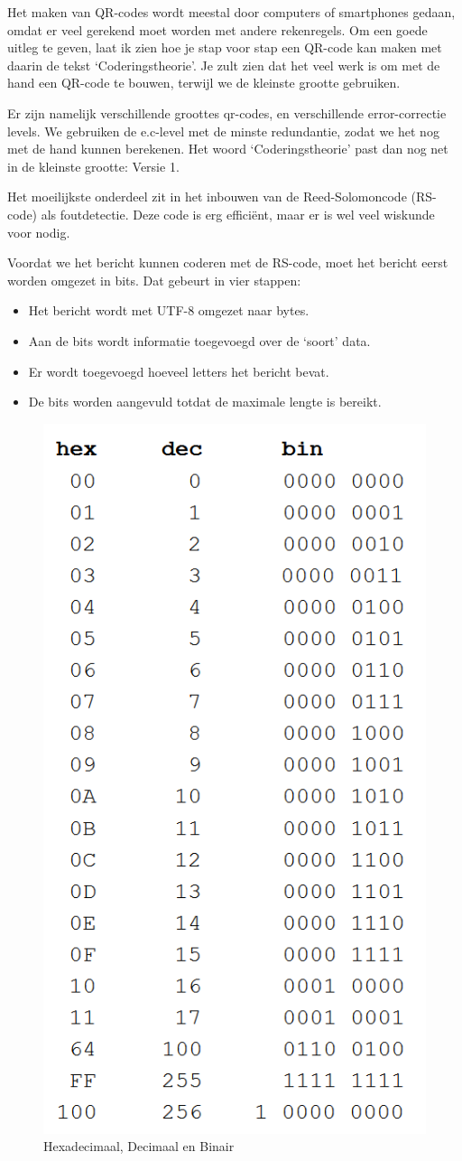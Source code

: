 \documentclass[a4paper]{article}
\begin{document}
Het maken van QR-codes wordt meestal door computers of smartphones gedaan, omdat er veel gerekend moet worden met andere rekenregels. Om een goede uitleg te geven, laat ik zien hoe je stap voor stap een QR-code kan maken met daarin de tekst `Coderingstheorie'. Je zult zien dat het veel werk is om met de hand een QR-code te bouwen, terwijl we de kleinste grootte gebruiken.

Er zijn namelijk verschillende groottes qr-codes, en verschillende error-correctie levels. We gebruiken de e.c-level met de minste redundantie, zodat we het nog met de hand kunnen berekenen. Het woord `Coderingstheorie' past dan nog net in de kleinste grootte: Versie 1.

Het moeilijkste onderdeel zit in het inbouwen van de Reed-Solomoncode (RS-code) als foutdetectie. Deze code is erg efficiënt, maar er is wel veel wiskunde voor nodig.

Voordat we het bericht kunnen coderen met de RS-code, moet het bericht eerst worden omgezet in bits. Dat gebeurt in vier stappen:
\begin{itemize}
    \item Het bericht wordt met UTF-8 omgezet naar bytes.
    \item Aan de bits wordt informatie toegevoegd over de `soort' data.
    \item Er wordt toegevoegd hoeveel letters het bericht bevat.
    \item De bits worden aangevuld totdat de maximale lengte is bereikt.
\end{itemize}

\begin{figure}[!htbp]
\centering
\includegraphics[width=0.3\linewidth]{hex-dec-bin-table2.png}
\caption{Hexadecimaal, Decimaal en Binair}
\label{fig:bin}
\end{figure}
\end{document}
